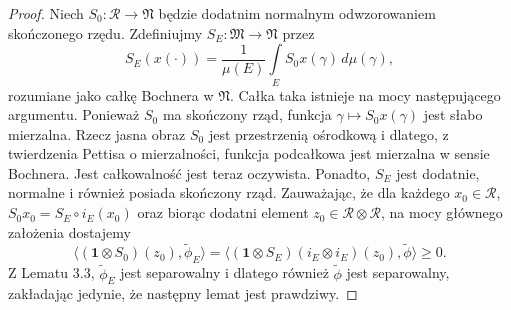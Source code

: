 \begin{proof}
Niech $S_{0}: \mathcal{R} \rightarrow \mathfrak{N}$ będzie dodatnim normalnym
odwzorowaniem skończonego rzędu.
Zdefiniujmy 
$S_{E}: \mathfrak{M} \rightarrow \mathfrak{N}$ przez
\begin{equation}
S_{E}(x(\cdot)) = \frac{1}{\mu(E)}
\int \limits_{E} S_{0}x(\gamma) \, d\mu(\gamma),
\end{equation}
rozumiane jako całkę Bochnera w $\mathfrak{N}$.
Całka taka istnieje na mocy następującego argumentu.
Ponieważ $S_{0}$ ma skończony rząd, funkcja
$\gamma \mapsto S_{0}x(\gamma)$ jest słabo mierzalna.
Rzecz jasna obraz $S_{0}$ jest przestrzenią ośrodkową i dlatego,
z twierdzenia Pettisa o mierzalności,
funkcja podcałkowa jest mierzalna w sensie Bochnera.
Jest całkowalność jest teraz oczywista.
Ponadto, $S_{E}$ jest dodatnie, normalne i również posiada skończony rząd.
Zauważając, że dla każdego $x_{0} \in \mathcal{R}$,
$S_{0}x_{0} = S_{E} \circ i_{E} (x_{0})$ oraz
biorąc dodatni element $z_{0} \in \mathcal{R} \otimes \mathcal{R}$,
na mocy głównego założenia dostajemy
\begin{equation}
\langle (\mathbf{1} \otimes S_{0})(z_{0}) , \tilde{\phi}_{E} \rangle =
\langle (\mathbf{1} \otimes S_{E})(i_{E} \otimes i_{E})(z_{0}),
\tilde{\phi} \rangle \geq 0.
\end{equation}
Z Lematu 3.3, $\tilde{\phi}_{E}$ jest separowalny i dlatego również
$\tilde{\phi}$ jest separowalny,
zakładając jedynie, że następny lemat jest prawdziwy.
\end{proof}

